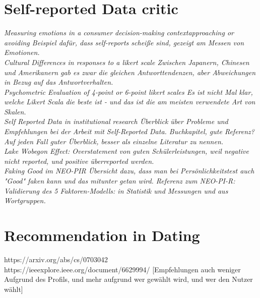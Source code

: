 \documentclass[nochapterpage,bigchapter,linedtoc,longdoc,colorback,accentcolor=tud3b,oneside]{tudreport}
\begin{document}
\section{Self-reported Data critic}
\textit{Measuring emotions in a consumer decision-making contextapproaching or avoiding \cite{sorensen2008measuring}
Beispiel dafür, dass self-reports scheiße sind, gezeigt am Messen von Emotionen.}\\

\textit{Cultural Differences in responses to a likert scale \cite{lee2002cultural}
Zwischen Japanern, Chinesen und Amerikanern gab es zwar die gleichen Antworttendenzen, aber Abweichungen in Bezug auf das Antwortverhalten.}\\

\textit{Psychometric Evaluation of 4-point or 6-point likert scales \cite{chang1994psychometric}
Es ist nicht Mal klar, welche Likert Scala die beste ist - und das ist die am meisten verwendete Art von Skalen.}\\

\textit{Self Reported Data in institutional research \cite{gonyea2005self}
Überblick über Probleme und Empfehlungen bei der Arbeit mit Self-Reported Data. Buchkapitel, gute Referenz? Auf jeden Fall guter Überblick, besser als einzelne Literatur zu nennen.}\\

\textit{Lake Wobegon Effect: Overstatement von guten Schülerleistungen, weil negative nicht reported, und positive überreported werden. \cite{maxwell1994lake}}\\

\textit{Faking Good im NEO-PIR \cite{griffin2004applicants}
Übersicht dazu, dass man bei Persönlichkeitstest auch "Good" faken kann und das mitunter getan wird. Referenz zum NEO-PI-R: \cite{ostendorf2004neo}}\\
\textit{Validierung des 5 Faktoren-Modells: \cite{mccrae1987validation} in Statistik und Messungen und \cite{goldberg1990alternative} aus Wortgruppen.}\\

\section{Recommendation in Dating}
https://arxiv.org/abs/cs/0703042\\

https://ieeexplore.ieee.org/document/6629994/ [Empfehlungen auch weniger Aufgrund des Profils, und mehr aufgrund wer gewählt wird, und wer den Nutzer wählt]\\
\end{document}
